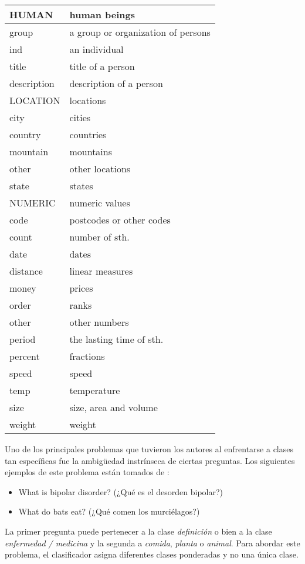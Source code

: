 \begin{center}
\begin{longtable}{| l | l |}
HUMAN & human beings\\ \hline 
  group & a group or organization of persons\\ \hline 
  ind & an individual\\ \hline 
  title & title of a person\\ \hline 
  description & description of a person\\ \hline 
LOCATION & locations\\ \hline 
  city & cities\\ \hline 
  country & countries\\ \hline 
  mountain & mountains\\ \hline 
  other & other locations\\ \hline 
  state & states\\ \hline 
NUMERIC & numeric values\\ \hline 
  code  & postcodes or other codes\\ \hline 
  count & number of sth.\\ \hline 
  date  & dates\\ \hline 
  distance &  linear measures\\ \hline 
  money & prices\\ \hline 
  order & ranks\\ \hline 
  other & other numbers\\ \hline 
  period  & the lasting time of sth.\\ \hline 
  percent & fractions\\ \hline 
  speed & speed\\ \hline 
  temp & temperature\\ \hline 
  size & size, area and volume\\ \hline 
  weight & weight\\ \hline 
\end{longtable}
\end{center}


Uno de los principales problemas que tuvieron los autores al enfrentarse a clases tan específicas fue la ambigüedad instrínseca de ciertas preguntas. Los siguientes ejemplos de este problema están tomados de \cite{QC2}:
\begin{itemize}
\item What is bipolar disorder? (¿Qué es el desorden bipolar?)
\item What do bats eat? (¿Qué comen los murciélagos?)
\end{itemize}
La primer pregunta puede pertenecer a la clase \textit{definición} o bien a la clase \textit{enfermedad / medicina} y la segunda a \textit{comida}, \textit{planta} o \textit{animal}. Para abordar este problema, el clasificador asigna diferentes clases ponderadas y no una única clase.

